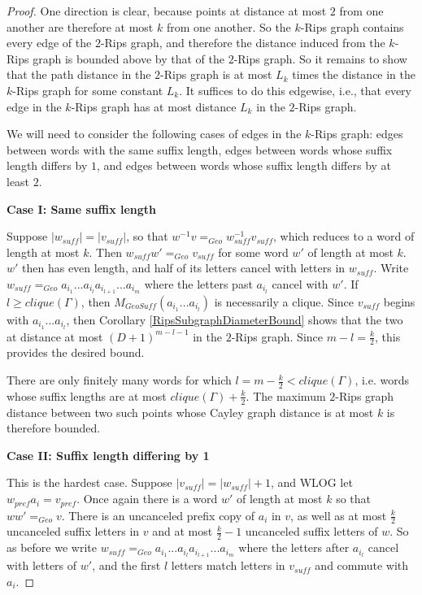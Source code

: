 \documentclass[10pt,a4paper]{amsart}
\theoremstyle{definition}
\theoremstyle{remark}
\begin{document}
	\begin{proof}
		
		One direction is clear, because points at distance at most $2$ from one another are therefore at most $k$ from one another. So the $k$-Rips graph contains every edge of the $2$-Rips graph, and therefore the distance induced from the $k$-Rips graph is bounded above by that of the $2$-Rips graph. So it remains to show that the path distance in the $2$-Rips graph is at most $L_k$ times the distance in the $k$-Rips graph for some constant $L_k$. It suffices to do this edgewise, i.e., that every edge in the $k$-Rips graph has at most distance $L_k$ in the $2$-Rips graph.
		
		We will need to consider the following cases of edges in the $k$-Rips graph: edges between words with the same suffix length, edges between words whose suffix length differs by $1$, and edges between words whose suffix length differs by at least $2$.
		
		\textbf{Case I: Same suffix length}
		
		Suppose $|w_{suff}|=|v_{suff}|$, so that $w^{-1}v=_{Geo}w_{suff}^{-1}v_{suff}$, which reduces to a word of length at most $k$. Then $w_{suff}w'=_{Geo}v_{suff}$ for some word $w'$ of length at most $k$. $w'$ then has even length, and half of its letters cancel with letters in $w_{suff}$. Write \newline $w_{suff}=_{Geo}a_{i_1}...a_{i_l}a_{i_{l+1}}...a_{i_m}$ where the letters past $a_{i_l}$ cancel with $w'$. If $l\ge clique(\Gamma)$, then $M_{GeoSuff}(a_{i_1}...a_{i_l})$ is necessarily a clique. Since $v_{suff}$ begins with $a_{i_1}...a_{i_l}$, then Corollary \ref{RipsSubgraphDiameterBound} shows that the two at distance at most $(D+1)^{m-l-1}$ in the $2$-Rips graph. Since $m-l=\frac{k}{2}$, this provides the desired bound.
		
		There are only finitely many words for which $l=m-\frac{k}{2}<clique(\Gamma)$, i.e. words whose suffix lengths are at most $clique(\Gamma)+\frac{k}{2}$. The maximum $2$-Rips graph distance between two such points whose Cayley graph distance is at most $k$ is therefore bounded.
		
		\textbf{Case II: Suffix length differing by 1}
		
		This is the hardest case. Suppose $|v_{suff}|=|w_{suff}|+1$, and WLOG let $w_{pref}a_i=v_{pref}$. Once again there is a word $w'$ of length at most $k$ so that $ww'=_{Geo}v$. There is an uncanceled prefix copy of $a_i$ in $v$, as well as at most $\frac{k}{2}$ uncanceled suffix letters in $v$ and at most $\frac{k}{2}-1$ uncanceled suffix letters of $w$. So as before we write $w_{suff}=_{Geo}a_{i_1}...a_{i_l}a_{i_{l+1}}...a_{i_m}$ where the letters after $a_{i_l}$ cancel with letters of $w'$, and the first $l$ letters match letters in $v_{suff}$ and commute with $a_i$. 
		

\end{proof}
\end{document}
